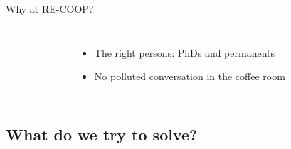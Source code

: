 \documentclass{beamer}
\begin{document}
\begin{frame}
{\begin{block}{Why at RE-COOP?}
\begin{columns}
\begin{center}
{\begin{figure}
          \end{figure}}
      \end{center}
      \begin{itemize}
      \item<2-> The right persons: PhDs and permanents 
      \item<3-> No polluted conversation in the coffee room
      \end{itemize}
    \end{columns}
  \end{block}}
\end{frame}

\subsection{What do we try to solve?}
\end{document}
